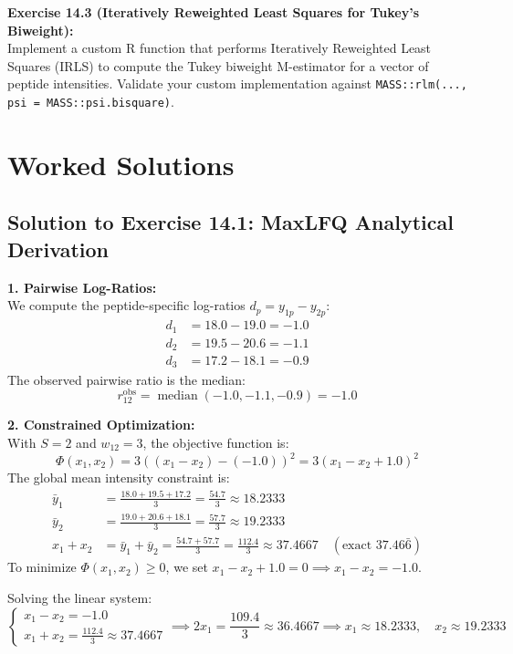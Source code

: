 \documentclass[11pt,oneside]{book}
\begin{document}
\vspace{0.8em}
\noindent\textbf{Exercise 14.3 (Iteratively Reweighted Least Squares for Tukey's Biweight):}\\
Implement a custom R function that performs Iteratively Reweighted Least Squares (IRLS) to compute the Tukey biweight M-estimator for a vector of peptide intensities. Validate your custom implementation against \texttt{MASS::rlm(..., psi = MASS::psi.bisquare)}.

\section{Worked Solutions}

\subsection*{Solution to Exercise 14.1: MaxLFQ Analytical Derivation}
\textbf{1. Pairwise Log-Ratios:}\\
We compute the peptide-specific log-ratios $d_p = y_{1p} - y_{2p}$:
\begin{align*}
d_1 &= 18.0 - 19.0 = -1.0 \\
d_2 &= 19.5 - 20.6 = -1.1 \\
d_3 &= 17.2 - 18.1 = -0.9
\end{align*}
The observed pairwise ratio is the median:
$$r_{12}^{\text{obs}} = \operatorname{median}(-1.0, -1.1, -0.9) = -1.0$$

\textbf{2. Constrained Optimization:}\\
With $S = 2$ and $w_{12} = 3$, the objective function is:
$$\Phi(x_1, x_2) = 3 \left( (x_1 - x_2) - (-1.0) \right)^2 = 3 (x_1 - x_2 + 1.0)^2$$
The global mean intensity constraint is:
\begin{align*}
\bar{y}_1 &= \frac{18.0 + 19.5 + 17.2}{3} = \frac{54.7}{3} \approx 18.2333 \\
\bar{y}_2 &= \frac{19.0 + 20.6 + 18.1}{3} = \frac{57.7}{3} \approx 19.2333 \\
x_1 + x_2 &= \bar{y}_1 + \bar{y}_2 = \frac{54.7 + 57.7}{3} = \frac{112.4}{3} \approx 37.4667 \quad (\text{exact } 37.46\bar{6})
\end{align*}
To minimize $\Phi(x_1, x_2) \ge 0$, we set $x_1 - x_2 + 1.0 = 0 \implies x_1 - x_2 = -1.0$.

Solving the linear system:
$$\begin{cases}
x_1 - x_2 = -1.0 \\
x_1 + x_2 = \frac{112.4}{3} \approx 37.4667
\end{cases} \implies 2x_1 = \frac{109.4}{3} \approx 36.4667 \implies x_1 \approx 18.2333, \quad x_2 \approx 19.2333$$
\end{document}
